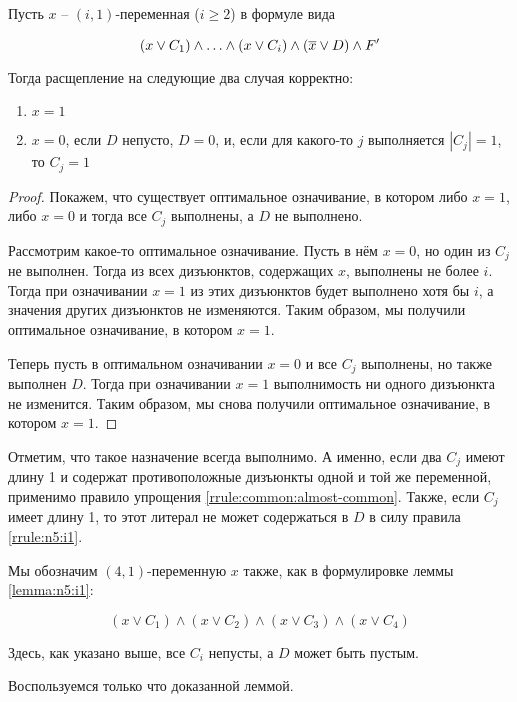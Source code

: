 \begin{lemma}
 Пусть $x$ -- $(i,1)$-переменная ($i \geq 2$) в формуле вида

 $$
  (x \vee C_1) \wedge \ldots \wedge (x \vee C_i) \wedge (\overline{x} \vee D) \wedge F'
 $$

 Тогда расщепление на следующие два случая корректно:
 \begin{enumerate}
  \item $x = 1$
  \item $x = 0$, если $D$ непусто, $D = 0$, и, если для какого-то $j$ выполняется $|C_j| = 1$, то $C_j = 1$
 \end{enumerate}
 \label{lemma:n5:i1}
\end{lemma}

\begin{proof}
 Покажем, что существует оптимальное означивание, в котором либо $x = 1$, либо $x = 0$ и тогда все $C_j$ выполнены, а $D$ не выполнено.

 Рассмотрим какое-то оптимальное означивание. Пусть в нём $x = 0$, но один из $C_j$ не выполнен. Тогда из всех дизъюнктов, содержащих $x$, выполнены не более $i$. Тогда при означивании $x = 1$ из этих дизъюнктов будет выполнено хотя бы $i$, а значения других дизъюнктов не изменяются. Таким образом, мы получили оптимальное означивание, в котором $x = 1$.

 Теперь пусть в оптимальном означивании $x = 0$ и все $C_j$ выполнены, но также выполнен $D$. Тогда при означивании $x = 1$ выполнимость ни одного дизъюнкта не изменится. Таким образом, мы снова получили оптимальное означивание, в котором $x = 1$.
\end{proof}

\begin{note}
 Отметим, что такое назначение всегда выполнимо. А именно, если два $C_j$ имеют длину 1 и содержат противоположные дизъюнкты одной и той же переменной, применимо правило упрощения \ref{rrule:common:almost-common}. Также, если $C_j$ имеет длину 1, то этот литерал не может содержаться в $D$ в силу правила \ref{rrule:n5:i1}.
\end{note}

Мы обозначим $(4,1)$-переменную $x$ также, как в формулировке леммы \ref{lemma:n5:i1}:

$$
 (x \vee C_1) \wedge (x \vee C_2) \wedge (x \vee C_3) \wedge (x \vee C_4)
$$

Здесь, как указано выше, все $C_i$ непусты, а $D$ может быть пустым.

Воспользуемся только что доказанной леммой.


